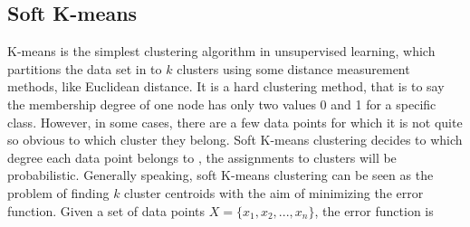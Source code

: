 \documentclass[11pt]{report}
\begin{document}
	\subsection{Soft K-means}
	\cite{report} K-means is the simplest clustering algorithm in unsupervised learning, which partitions the data set in to $k$ clusters using some distance measurement methods, like Euclidean distance. It is a hard clustering method, that is to say the membership degree of one node has only two values 0 and 1 for a specific class. However, in some cases, there are a few data points for which it is not quite so obvious to which cluster they belong. Soft K-means clustering decides to which degree each data point belongs to , the assignments to clusters will be probabilistic. Generally speaking, soft K-means clustering can be seen as the problem of finding $k$ cluster centroids with the aim of minimizing the error function. Given a set of data points $X = \{x_1,x_2,...,x_n\}$, the error function is
	
\end{document}
